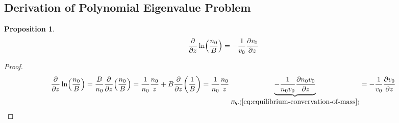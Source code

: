 \documentclass{article}
\theoremstyle{plain}
\newtheorem{proposition}{Proposition}
\theoremstyle{definition}
\theoremstyle{remark}
\theoremstyle{remark}
\begin{document}
\subsection{Derivation of Polynomial Eigenvalue Problem}
\begin{proposition}
    \begin{equation}
        \pdv{z}\ln(\frac{n_0}{B}) = -\frac{1}{v_0}\pdv{v_0}{z}
        \label{eq:dv-ln}
    \end{equation}
\end{proposition}
\begin{proof}
    \[ \pdv{z}\ln(\frac{n_0}{B}) 
    = \frac{B}{n_0}\pdv{z}(\frac{n_0}{B})
    = \frac{1}{n_0}\frac{n_0}{z} + B\pdv{z}(\frac{1}{B})
    =
    \frac{1}{n_0}\frac{n_0}{z} \underbrace{- \frac{1}{n_0v_0}\pdv{n_0v_0}{z}}_{Eq.(\ref{eq:equilibrium-convervation-of-mass})}
    = -\frac{1}{v_0}\pdv{v_0}{z} \]
\end{proof}
\end{document}
